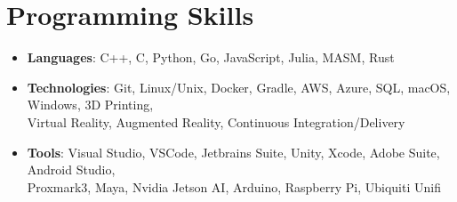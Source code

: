 \documentclass[letterpaper,11pt]{article}
\newcommand{\resumeSubHeadingListStart}{\begin{itemize}[leftmargin=*]}
\newcommand{\resumeSubHeadingListEnd}{\end{itemize}}
\begin{document}
%
\section{Programming Skills}
 \resumeSubHeadingListStart
   \item{
     \textbf{Languages}{: C++, C, Python, Go, JavaScript, Julia, MASM, Rust}
     \hfill
    
   }
   \item{ \textbf{Technologies}{: Git, Linux/Unix, Docker, Gradle, AWS, Azure, SQL, macOS, Windows, 3D Printing,\\ Virtual Reality, Augmented Reality, Continuous Integration/Delivery}}
   \item{
    \textbf{Tools}{: Visual Studio, VSCode, Jetbrains Suite, Unity, Xcode, Adobe Suite, Android Studio,\\ Proxmark3, Maya, Nvidia Jetson AI, Arduino, Raspberry Pi, Ubiquiti Unifi}
   }
 \resumeSubHeadingListEnd


\end{document}
